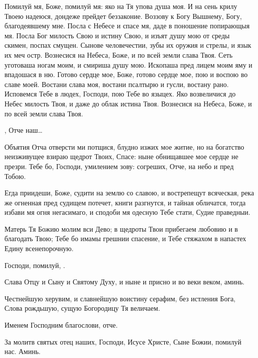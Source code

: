 \begin{mymulticols}


Помилуй мя, Боже, помилуй мя: яко на Тя упова душа моя. И на сень крилу Твоею надеюся, дондеже прейдет беззаконие. Воззову к Богу Вышнему, Богу, благодеявшему мне. Посла с Небесе и спасе мя, даде в поношение попирающыя мя. Посла Бог милость Свою и истину Свою, и изъят душу мою от среды скимен, поспах смущен. Сынове человечестии, зубы их оружия и стрелы, и язык их меч остр. Вознесися на Небеса, Боже, и по всей земли слава Твоя. Сеть уготоваша ногам моим, и смириша душу мою. Ископаша пред лицем моим яму и впадошася в ню. Готово сердце мое, Боже, готово сердце мое, пою и воспою во славе моей. Востани слава моя, востани псалтырю и гусли, востану рано. Исповемся Тебе в людех, Господи, пою Тебе во языцех. Яко возвеличися до Небес милость Твоя, и даже до облак истина Твоя. Вознесися на Небеса, Боже, и по всей земли слава Твоя.


 ,  Отче наш…




Объятия Отча отверсти ми потщися, блудно изжих мое житие, но на богатство неизживущее взираю щедрот Твоих, Спасе: ныне обнищавшее мое сердце не презри. Тебе бо, Господи, умилением зову: согреших, Отче, на небо и пред Тобою.


 Егда приидеши, Боже, судити на землю со славою, и вострепещут всяческая, река же огненная пред судищем потечет, книги разгнутся, и тайная обличатся, тогда избави мя огня негасимаго, и сподоби мя одесную Тебе стати, Судие праведныи.


 Матерь Тя Божию молим вси Дево; в щедроты Твои прибегаем любовию и в благодать Твою; Тебе бо имамы грешнии спасение, и Тебе стяжахом в напастех Едину всенепорочную.


 Господи, помилуй, .

Слава Отцу и Сыну и Святому Духу, и ныне и присно и во веки веком, аминь.

Честнейшую херувим, и славнейшую воистину серафим, без истления Бога, Слова рождьшую, сущую Богородицу Тя величаем.


Именем Господним благослови, отче.

За молитв святых отец наших, Господи, Исусе Христе, Сыне Божии, помилуй нас. Аминь.





\end{mymulticols}
